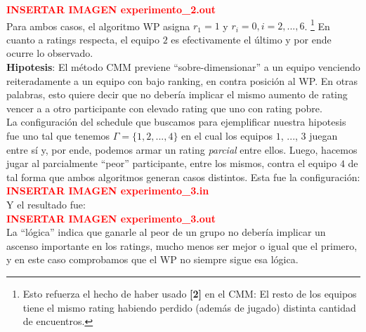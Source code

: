 \textcolor{red}{\textbf{INSERTAR IMAGEN experimento_2.out}} \\

Para ambos casos, el algoritmo WP asigna $r_1 = 1$ y $r_i = 0, i = 2, ..., 6$. \footnote{Esto refuerza el hecho de haber usado \textbf{[2]} en el CMM: El resto de los equipos tiene el mismo rating habiendo perdido (además de jugado) distinta cantidad de encuentros.} En cuanto a ratings respecta, el equipo $2$ es efectivamente el \'ultimo y por ende ocurre lo observado. \\

\textbf{Hipotesis}: El m\'etodo CMM previene ``sobre-dimensionar'' a un equipo venciendo reiteradamente a un equipo con bajo ranking, en contra posici\'on al WP. En otras palabras, esto quiere decir que no deber\'ia implicar el mismo aumento de rating vencer a a otro participante con elevado rating que uno con rating pobre. \\

La configuraci\'on del schedule que buscamos para ejemplificar nuestra hipotesis fue uno tal que tenemos $\Gamma = \{1,2,...,4\}$ en el cual los equipos $1$, ..., $3$ juegan entre s\'i y, por ende, podemos armar un rating \textit{parcial} entre ellos. Luego, hacemos jugar al parcialmente ``peor'' participante, entre los mismos, contra el equipo $4$ de tal forma que ambos algoritmos generan casos distintos. Esta fue la configuraci\'on: \\

\textcolor{red}{\textbf{INSERTAR IMAGEN experimento_3.in}} \\

Y el resultado fue: \\

\textcolor{red}{\textbf{INSERTAR IMAGEN experimento_3.out}} \\

La ``l\'ogica'' indica que ganarle al peor de un grupo no deber\'ia implicar un ascenso importante en los ratings, mucho menos ser mejor o igual que el primero, y en este caso comprobamos que el WP no siempre sigue esa l\'ogica.
